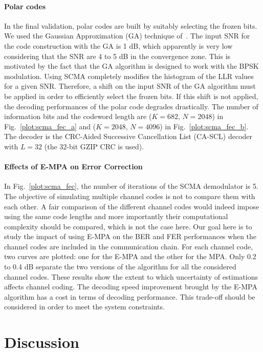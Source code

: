 \paragraph{Polar codes}

In the final validation, polar codes are built by suitably selecting the frozen
bits. We used the Gaussian Approximation (GA) technique of~\cite{Trifonov2012}.
The input SNR for the code construction with the GA is 1 dB, which apparently is
very low considering that the SNR are 4 to 5 dB in the convergence zone. This is
motivated by the fact that the GA algorithm is designed to work with the BPSK
modulation. Using SCMA completely modifies the histogram of the LLR values for a
given SNR. Therefore, a shift on the input SNR of the GA algorithm must be
applied in order to efficiently select the frozen bits. If this shift is
not applied, the decoding performances of the polar code degrades drastically.
The number of information bits and the codeword length are ($K=682$, $N=2048$)
in Fig.~\ref{plot:scma_fec_a} and ($K=2048$, $N=4096$) in
Fig.~\ref{plot:scma_fec_b}. The decoder is the CRC-Aided Successive Cancellation
List (CA-SCL) decoder with $L=32$ (the 32-bit GZIP CRC is used).

\paragraph{Effects of E-MPA on Error Correction}
\label{sec:scma_fec_e-mpa}

In Fig.~\ref{plot:scma_fec}, the number of iterations of the SCMA demodulator is
5. The objective of simulating multiple channel codes is not to compare them
with each other. A fair comparison of the different channel codes would indeed
impose using the same code lengths and more importantly their computational
complexity should be compared, which is not the case here. Our goal here is to
study the impact of using E-MPA on the BER and FER performances when the channel
codes are included in the communication chain. For each channel code, two curves
are plotted: one for the E-MPA and the other for the MPA. Only 0.2 to 0.4 dB
separate the two versions of the algorithm for all the considered channel codes.
These results show the extent to which uncertainty of estimations affects
channel coding. The decoding speed improvement brought by the E-MPA algorithm
has a cost in terms of decoding performance. This trade-off should be considered
in order to meet the system constraints.

\section{Discussion}

